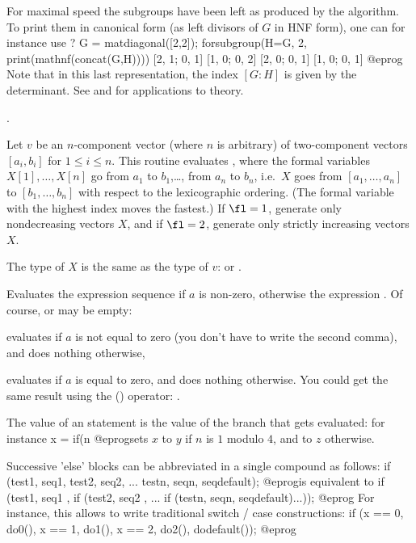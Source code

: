 For maximal speed the subgroups have been left as produced by the algorithm.
To print them in canonical form (as left divisors of $G$ in HNF form), one
can for instance use
\bprog
? G = matdiagonal([2,2]); forsubgroup(H=G, 2, print(mathnf(concat(G,H))))
[2, 1; 0, 1]
[1, 0; 0, 2]
[2, 0; 0, 1]
[1, 0; 0, 1]
@eprog\noindent
Note that in this last representation, the index $[G:H]$ is given by the
determinant. See  and  for
applications to  theory.

.

\label{se:forvec}
Let $v$ be an $n$-component
vector (where $n$ is arbitrary) of two-component vectors $[a_i,b_i]$
for $1\le i\le n$. This routine evaluates , where the formal
variables $X[1],\dots, X[n]$ go from $a_1$ to $b_1$,\dots, from $a_n$ to
$b_n$, i.e.~$X$ goes from $[a_1,\dots,a_n]$ to $[b_1,\dots,b_n]$ with respect
to the lexicographic ordering. (The formal variable with the highest index
moves the fastest.) If $\fl=1$, generate only nondecreasing vectors $X$, and
if $\fl=2$, generate only strictly increasing vectors $X$.

The type of $X$ is the same as the type of $v$:  or .

\label{se:if}
Evaluates the expression sequence  if $a$ is non-zero, otherwise
the expression . Of course,  or  may be empty:

 evaluates  if $a$ is not equal to zero
(you don't have to write the second comma), and does nothing otherwise,

 evaluates  if $a$ is equal to zero, and
does nothing otherwise. You could get the same result using the \kbd{!}
() operator: .

The value of an  statement is the value of the branch that gets
evaluated: for instance
\bprog
x = if(n %
@eprog\noindent sets $x$ to $y$ if $n$ is $1$ modulo $4$, and to $z$
otherwise.

Successive 'else' blocks can be abbreviated in a single compound 
as follows:
\bprog
if (test1, seq1,
    test2, seq2,
    ...
    testn, seqn,
    seqdefault);
@eprog\noindent is equivalent to
\bprog
if (test1, seq1
         , if (test2, seq2
                    , ...
                      if (testn, seqn, seqdefault)...));
@eprog For instance, this allows to write traditional switch / case
constructions:
\bprog
if (x == 0, do0(),
    x == 1, do1(),
    x == 2, do2(),
    dodefault());
@eprog

